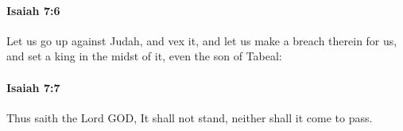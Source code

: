 		\paragraph{Isaiah 7:6} %
			\label{ISAIAH-7-6}

			Let us go up against Judah, and vex it, and let us make a breach therein for us, and set a king in the midst of it, even the son of Tabeal:


		\paragraph{Isaiah 7:7} %
			\label{ISAIAH-7-7}

			Thus saith the Lord GOD, It shall not stand, neither shall it come to pass.


